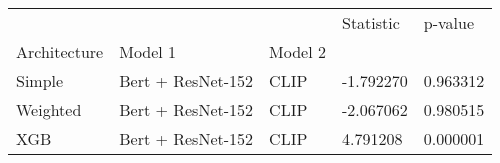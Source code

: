 \begin{tabular}{lllll}
 &  &  & Statistic & p-value \\
Architecture & Model 1 & Model 2 &  &  \\
Simple & Bert + ResNet-152 & CLIP & -1.792270 & 0.963312 \\
Weighted & Bert + ResNet-152 & CLIP & -2.067062 & 0.980515 \\
XGB & Bert + ResNet-152 & CLIP & 4.791208 & 0.000001 \\
\end{tabular}
